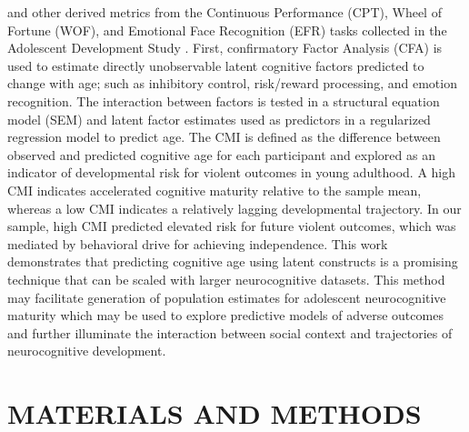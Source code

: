 \documentclass[utf8]{frontiersSCNS} %
\begin{document}
and other derived metrics from the Continuous Performance (CPT), Wheel of Fortune (WOF), and Emotional Face Recognition (EFR) tasks collected in the Adolescent Development Study \citep{Fishbein2016}. First, confirmatory Factor Analysis (CFA) is used to estimate directly unobservable latent cognitive factors predicted to change with age; such as inhibitory control, risk/reward processing, and emotion recognition. The interaction between factors is tested in a structural equation model (SEM) and latent factor estimates used as predictors in a regularized regression model to predict age. The CMI is defined as the difference between observed and predicted cognitive age for each participant and explored as an indicator of developmental risk for violent outcomes in young adulthood. A high CMI indicates accelerated cognitive maturity relative to the sample mean, whereas a low CMI indicates a relatively lagging developmental trajectory. In our sample, high CMI predicted elevated risk for future violent outcomes, which was mediated by behavioral drive for achieving independence. This work demonstrates that predicting cognitive age using latent constructs is a promising technique that can be scaled with larger neurocognitive datasets. This method may facilitate generation of population estimates for adolescent neurocognitive maturity which may be used to explore predictive models of adverse outcomes and further illuminate the interaction between social context and trajectories of neurocognitive development. 
\section{MATERIALS AND METHODS}
\end{document}
